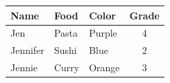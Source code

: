 \begin{center}
    \begin{tabular}{|l|l|l|c|}
    \hline
    \textbf{Name} & \textbf{Food} & \textbf{Color} & \textbf{Grade} \\
    \hline
    Jen      & Pasta  & Purple & 4 \\
    Jennifer & Sushi  & Blue   & 2 \\
    Jennie   & Curry  & Orange & 3 \\
    \hline
    \end{tabular}
\end{center}
    
